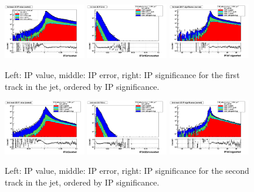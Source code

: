 \begin{figure}[h!]
\centering
\includegraphics[width=0.32\textwidth]{figures/IP3d1sorted_Log.png}
\includegraphics[width=0.32\textwidth]{figures/IP3d1Errorsorted_Log.png}
\includegraphics[width=0.32\textwidth]{figures/IP3d1sigsorted_Log.png}
\caption{Left: IP value, middle: IP error, right: IP significance for the first track in the jet, ordered by IP significance.  }
\label{fig:IPfirstTrack}
\end{figure}

\begin{figure}[h!]
\centering
\includegraphics[width=0.32\textwidth]{figures/IP3d2sorted_Log.png}
\includegraphics[width=0.32\textwidth]{figures/IP3d2Errorsorted_Log.png}
\includegraphics[width=0.32\textwidth]{figures/IP3d2sigsorted_Log.png}
\caption{Left: IP value, middle: IP error, right: IP significance for the second track in the jet, ordered by IP significance.  }
\label{fig:IPsecondTrack}
\end{figure}

